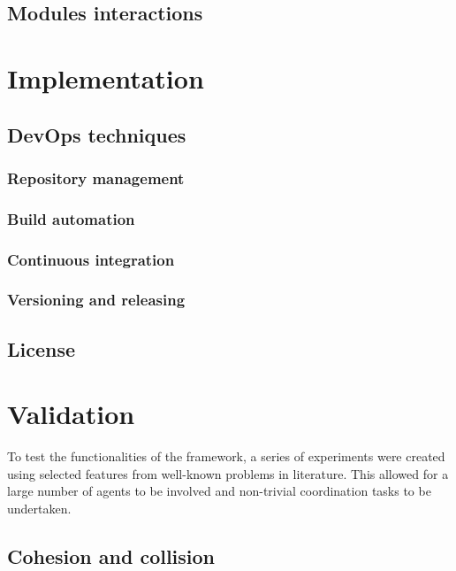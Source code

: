 \documentclass[12pt,a4paper,openright,twoside]{book}
\begin{document}
\section{Modules interactions}

\chapter{Implementation} 
\label{chap:implementation}

\section{DevOps techniques}
\subsection*{Repository management}
\subsection*{Build automation}
\subsection*{Continuous integration}
\subsection*{Versioning and releasing}

\section{License}

\chapter{Validation} 
\label{chap:validation}
To test the functionalities of the framework, a series of experiments were created using selected 
    features from well-known problems in literature. This allowed for a large number of 
    agents to be involved and non-trivial coordination tasks to be undertaken.

\section{Cohesion and collision}
\end{document}
